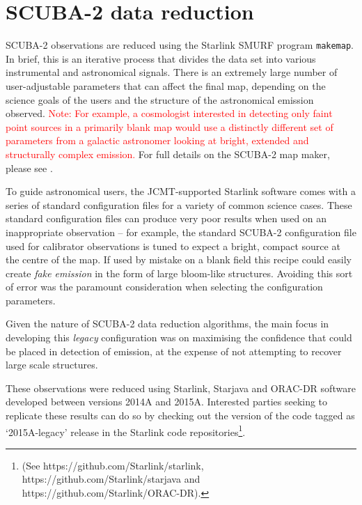 \documentclass[twocolumn,times]{aastex6}
\newcommand{\note}[1]{\textcolor{red}{Note: #1}}
\begin{document}
\section{SCUBA-2 data reduction}
\label{sec:dr}
SCUBA-2 observations are reduced using the Starlink SMURF program
\texttt{makemap}. In brief, this is an iterative process that divides
the data set into various instrumental and astronomical signals. There
is an extremely large number of user-adjustable parameters that can
affect the final map, depending on the science goals of the users and
the structure of the astronomical emission observed. \note{For example, a
cosmologist interested in detecting only faint point sources in a
primarily blank map would use a distinctly different set of parameters
from a galactic astronomer looking at bright, extended and
structurally complex emission.} For full details on the SCUBA-2 map
maker, please see \citet{Chapin2013}.


To guide astronomical users, the JCMT-supported Starlink software
comes with a series of standard configuration files for a variety of
common science cases.
These standard configuration files can produce very poor results when
used on an inappropriate observation -- for example, the standard
SCUBA-2 configuration file used for calibrator observations is tuned
to expect a bright, compact source at the centre of the map. If used
by mistake on a blank field this recipe could easily create \emph{fake
  emission} in the form of large bloom-like structures. Avoiding this
sort of error was the paramount consideration when selecting the
configuration parameters.

Given the nature of SCUBA-2 data reduction algorithms, the main focus
in developing this \emph{legacy} configuration was on maximising the
confidence that could be placed in detection of emission, at the
expense of not attempting to recover large scale structures.

These observations were reduced using Starlink, Starjava and ORAC-DR
software developed between versions 2014A and 2015A. Interested
parties seeking to replicate these results can do so by checking out
the version of the code tagged as `2015A-legacy' release in the
Starlink code repositories\footnote{(See
  https://github.com/Starlink/starlink,
  https://github.com/Starlink/starjava and
  https://github.com/Starlink/ORAC-DR).}.
\end{document}
